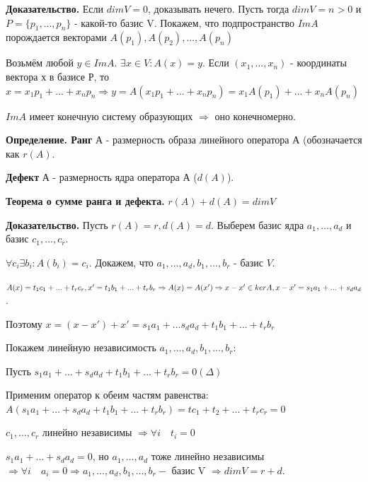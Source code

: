 \documentclass[a4paper]{article}
\begin{document}
    \begin{hproof}
        \textbf{Доказательство.} Если $dimV = 0$, доказывать нечего.
        Пусть тогда $dimV = n>0$ и $P = \{p_1, ..., p_n\}$ - какой-то базис V. Покажем, что подпространство $ImA$ порождается векторами $A(p_1), A(p_2), ..., A(p_n)$

        Возьмём любой $y \in ImA$. $\exists x \in V: A(x) = y$. Если $(x_1, ..., x_n)$ - координаты вектора х в базисе Р, то $x = x_1p_1 + ... + x_np_n \Rightarrow y = A(x_1p_1 + ... + x_np_n) = x_1A(p_1) + ... + x_nA(p_n)$

        $ImA$ имеет конечную систему образующих $\Rightarrow$ оно конечномерно.
    \end{hproof}

    \textbf{Определение. Ранг} А - размерность образа линейного оператора А (обозначается как $r(A)$.

    \textbf{Дефект} А - размерность ядра оператора А ($d(A)$).

    \begin{htheorem}
        \textbf{Теорема о сумме ранга и дефекта.} $r(A) + d(A) = dimV$
    \end{htheorem}

    \begin{hproof}
        \textbf{Доказательство.} Пусть $r(A) = r, d(A) = d$. Выберем базис ядра $a_1, ..., a_d$ и базис $c_1, ..., c_r$.

        $\forall c_i \exists b_i: A(b_i) = c_i$. Докажем, что $a_1, ..., a_d, b_1, ..., b_r$ - базис $V$.

        $A(x) = t_1c_1 + ... + t_rc_r, x' = t_1b_1 + ... + t_rb_r\\ \Rightarrow A(x) = A(x') \Rightarrow x-x' \in kerA, x-x' = s_1a_1 + ... + s_da_d$.

        Поэтому $x=(x-x')+x' = s_1a_1 + ... s_da_d + t_1b_1 + ... + t_rb_r$

        Покажем линейную независимость $a_1, ..., a_d, b_1, ..., b_r$:

        Пусть $s_1a_1 + ... + s_da_d + t_1b_1 + ... +t_rb_r = 0 (\Delta)$

        Применим оператор к обеим частям равенства: $A(s_1a_1 + ... + s_da_d + t_1b_1 + ... +t_rb_r) = tc_1 + t_2 + ... + t_rc_r = 0$

        $c_1, ..., c_r$ линейно независимы $\Rightarrow \forall i \quad  t_i = 0$

        $s_1a_1 + ... + s_da_d = 0$, но $a_1, ..., a_d$ тоже линейно независимы $\Rightarrow \forall i \quad  a_i = 0 \Rightarrow a_1, ..., a_d, b_1, ..., b_r -$ базис V $\Rightarrow dimV = r+d$.
    \end{hproof}
\end{document}
